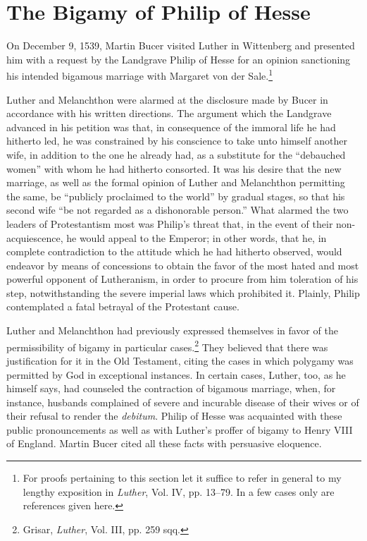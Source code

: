 \section{The Bigamy of Philip of Hesse}

On December 9, 1539, Martin Bucer visited Luther in Wittenberg
and presented him with a request by the Landgrave Philip of
Hesse for an opinion sanctioning his intended bigamous marriage with
Margaret von der Sale.\footnote
{For proofs pertaining to this section let it suffice to refer in general to my lengthy
exposition in \textit{Luther}, Vol. IV, pp. 13--79. In a few cases only are references given here.}

Luther and Melanchthon were alarmed at the disclosure made by
Bucer in accordance with his written directions. The argument which
the Landgrave advanced in his petition was that, in consequence of
the immoral life he had hitherto led, he was constrained by his conscience
to take unto himself another wife, in addition to the one he
already had, as a substitute for the “debauched women” with whom
he had hitherto consorted. It was his desire that the new marriage, as
well as the formal opinion of Luther and Melanchthon permitting the
same, be “publicly proclaimed to the world” by gradual stages, so that
his second wife “be not regarded as a dishonorable person.” What
alarmed the two leaders of Protestantism most was Philip’s threat
that, in the event of their non-acquiescence, he would appeal to the
Emperor; in other words, that he, in complete contradiction to the
attitude which he had hitherto observed, would endeavor by means
of concessions to obtain the favor of the most hated and most powerful
opponent of Lutheranism, in order to procure from him toleration of his
step, notwithstanding the severe imperial laws which prohibited
it. Plainly, Philip contemplated a fatal betrayal of the Protestant cause.

Luther and Melanchthon had previously expressed themselves in
favor of the permissibility of bigamy in particular cases.\footnote{Grisar, \textit{Luther}, Vol. III, pp. 259 sqq.}
 They believed
that there was justification for it in the Old Testament, citing
the cases in which polygamy was permitted by God in exceptional instances.
In certain cases, Luther, too, as he himself says, had counseled
the contraction of bigamous marriage, when, for instance, husbands
complained of severe and incurable disease of their wives or of their
refusal to render the \textit{debitum}. Philip of Hesse was acquainted with
these public pronouncements as well as with Luther’s proffer of bigamy
to Henry VIII of England. Martin Bucer cited all these facts
with persuasive eloquence.

